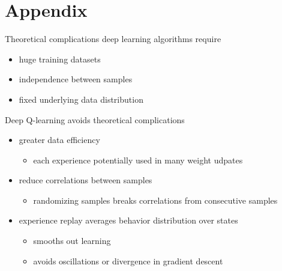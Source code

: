 \section*{Appendix}

\begin{frame}{Theoretical complications}
    deep learning algorithms require
    \vspace*{0.5em}
    \begin{itemize}\itemsep=12pt

        \item huge training datasets

        \item independence between samples

        \item fixed underlying data distribution

    \end{itemize}
\end{frame}

\begin{frame}{Deep Q-learning}
    avoids theoretical complications
    \vspace*{0.5em}
    \begin{itemize}\itemsep=12pt

        \item greater data efficiency
        \vspace*{0.5em}
        \begin{itemize}
            \item each experience potentially used in many weight udpates
        \end{itemize}

        \item reduce correlations between samples
        \vspace*{0.5em}
        \begin{itemize}
            \item randomizing samples breaks correlations from consecutive samples
        \end{itemize}

        \item experience replay averages behavior distribution over states
        \vspace*{0.5em}
        \begin{itemize}
            \item smooths out learning
            \item avoids oscillations or divergence in gradient descent
        \end{itemize}

    \end{itemize}
\end{frame}

